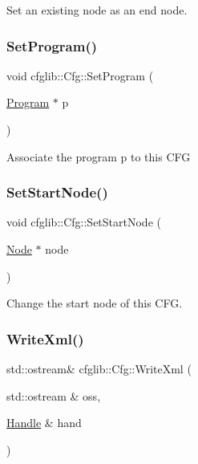 Set an existing node as an end node. \mbox{\label{classcfglib_1_1Cfg_a6408b372beac5ab2eaa02dbea18ca23c}} 
\subsubsection{\texorpdfstring{Set\+Program()}{SetProgram()}}
{\footnotesize\ttfamily void cfglib\+::\+Cfg\+::\+Set\+Program (\begin{DoxyParamCaption}\item[{\hyperlink{classcfglib_1_1Program}{Program} $\ast$}]{p }\end{DoxyParamCaption})}

Associate the program p to this C\+FG \mbox{\label{classcfglib_1_1Cfg_ad77f85cebfb1ef7e55afa78f48b6f96e}} 
\subsubsection{\texorpdfstring{Set\+Start\+Node()}{SetStartNode()}}
{\footnotesize\ttfamily void cfglib\+::\+Cfg\+::\+Set\+Start\+Node (\begin{DoxyParamCaption}\item[{\hyperlink{classcfglib_1_1Node}{Node} $\ast$}]{node }\end{DoxyParamCaption})}

Change the start node of this C\+FG. \mbox{\label{classcfglib_1_1Cfg_a05c9fc4c8a7e5c0850e6998722433787}} 
\subsubsection{\texorpdfstring{Write\+Xml()}{WriteXml()}}
{\footnotesize\ttfamily std\+::ostream\& cfglib\+::\+Cfg\+::\+Write\+Xml (\begin{DoxyParamCaption}\item[{std\+::ostream \&}]{oss,  }\item[{\hyperlink{classcfglib_1_1Handle}{Handle} \&}]{hand }\end{DoxyParamCaption})\hspace{0.3cm}{\ttfamily [virtual]}}

